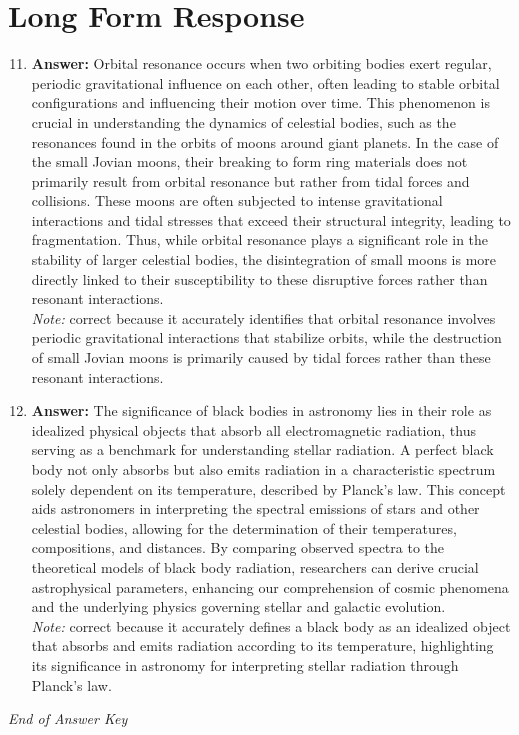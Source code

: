 \documentclass[12pt]{article}
\begin{document}
\section*{Long Form Response}
\begin{enumerate}[label=\arabic*.]
\setcounter{enumi}{10}
\item \textbf{Answer:} Orbital resonance occurs when two orbiting bodies exert regular, periodic gravitational influence on each other, often leading to stable orbital configurations and influencing their motion over time. This phenomenon is crucial in understanding the dynamics of celestial bodies, such as the resonances found in the orbits of moons around giant planets. In the case of the small Jovian moons, their breaking to form ring materials does not primarily result from orbital resonance but rather from tidal forces and collisions. These moons are often subjected to intense gravitational interactions and tidal stresses that exceed their structural integrity, leading to fragmentation. Thus, while orbital resonance plays a significant role in the stability of larger celestial bodies, the disintegration of small moons is more directly linked to their susceptibility to these disruptive forces rather than resonant interactions.
\\ \textit{Note:} correct because it accurately identifies that orbital resonance involves periodic gravitational interactions that stabilize orbits, while the destruction of small Jovian moons is primarily caused by tidal forces rather than these resonant interactions.
\item \textbf{Answer:} The significance of black bodies in astronomy lies in their role as idealized physical objects that absorb all electromagnetic radiation, thus serving as a benchmark for understanding stellar radiation. A perfect black body not only absorbs but also emits radiation in a characteristic spectrum solely dependent on its temperature, described by Planck's law. This concept aids astronomers in interpreting the spectral emissions of stars and other celestial bodies, allowing for the determination of their temperatures, compositions, and distances. By comparing observed spectra to the theoretical models of black body radiation, researchers can derive crucial astrophysical parameters, enhancing our comprehension of cosmic phenomena and the underlying physics governing stellar and galactic evolution.
\\ \textit{Note:} correct because it accurately defines a black body as an idealized object that absorbs and emits radiation according to its temperature, highlighting its significance in astronomy for interpreting stellar radiation through Planck's law.
\end{enumerate}

\vfill
\noindent\textit{End of Answer Key}
\end{document}
